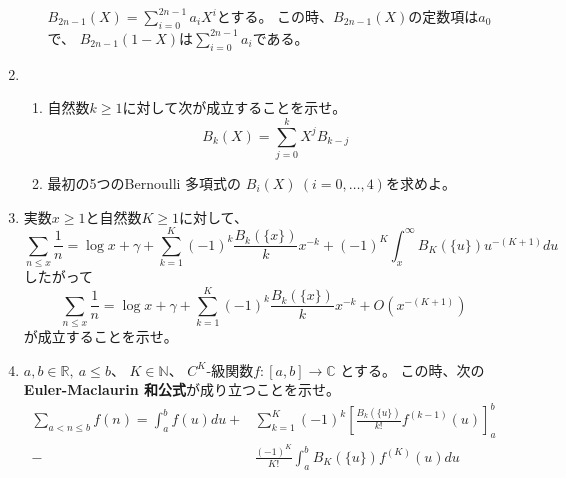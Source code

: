 \documentclass[12pt,b5paper]{ltjsarticle}
\begin{document}
\begin{enumerate}
\begin{enumerate}
            $B_{2n-1}(X)=\sum_{i=0}^{2n-1}a_{i}X^{i}$とする。
            この時、$B_{2n-1}(X)$の定数項は$a_{0}$で、
            $B_{2n-1}(1-X)$は$\sum_{i=0}^{2n-1}a_{i}$である。
            



\hrulefill

      \end{enumerate}



 \item
      \begin{enumerate}
       \item
            自然数$k\geq 1$に対して次が成立することを示せ。
            \begin{equation}
             B_{k}(X) = \sum_{j=0}^{k}X^{j}B_{k-j}
            \end{equation}

\dotfill

\hrulefill

       \item
            最初の5つのBernoulli 多項式の
            $B_{i}(X) \ (i=0,\dots,4)$を求めよ。

\dotfill

\hrulefill

      \end{enumerate}

 \item
      実数$x\geq 1$と自然数$K\geq 1$に対して、
      \begin{equation}
       \sum_{n\leq x}\frac{1}{n}
        = \log{x} + \gamma
        + \sum_{k=1}^{K}(-1)^{k}\frac{B_{k}(\{x\})}{k}x^{-k}
        + (-1)^{K}\int_{x}^{\infty} B_{K}(\{u\})u^{-(K+1)}du
      \end{equation}
      したがって
      \begin{equation}
       \sum_{n\leq x}\frac{1}{n}
        = \log{x} + \gamma
        + \sum_{k=1}^{K}(-1)^{k}\frac{B_{k}(\{x\})}{k}x^{-k}
        + O(x^{-(K+1)})
      \end{equation}
      が成立することを示せ。

\dotfill

\hrulefill

 \item
      $a,b\in\mathbb{R},\ a\leq b$、
      $K\in\mathbb{N}$、
      $C^{K}$-級関数$f: [a,b]\to\mathbb{C}$
      とする。
      この時、次の\textbf{Euler-Maclaurin 和公式}が成り立つことを示せ。
      \begin{equation}
        \begin{split}
         \sum_{a<n\leq b}f(n)
        =
         \int_{a}^{b}f(u)du
         + & \sum_{k=1}^{K}(-1)^{k}
           \left[ \frac{B_{k}(\{u\})}{k!}f^{(k-1)}(u) \right]_{a}^{b}\\
        - & \frac{(-1)^{K}}{K!}
          \int_{a}^{b} B_{K}(\{u\})f^{(K)}(u)du
        \end{split}
      \end{equation}


\end{enumerate}
\end{document}
